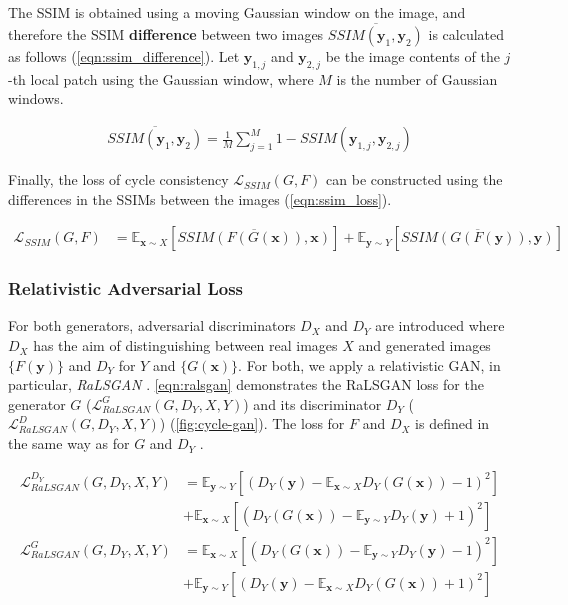 \documentclass[a4paper,11pt, DIV=12]{scrartcl}
\newcommand{\x}{\boldsymbol{x}}
\newcommand{\y}{\boldsymbol{y}}
\begin{document}
The SSIM is obtained using a moving Gaussian window on the image, and therefore the SSIM \textbf{difference} between two images $\overline{SSIM(\y_1,\y_2)}$ is calculated as follows (\autoref{eqn:ssim_difference}).
Let $\y_{1,j}$ and $\y_{2,j}$ be the image contents of the $j$-th local patch using the Gaussian window, where $M$ is the number of Gaussian windows.

\begin{equation}
   \label{eqn:ssim_difference}
   \begin{aligned}
      \overline{SSIM(\y_1,\y_2)} = \frac{1}{M}\sum_{j=1}^{M}1 - SSIM(\y_{1,j},\y_{2,j})
   \end{aligned}
\end{equation}

Finally, the loss of cycle consistency $\mathcal{L}_{SSIM}(G, F)$ can be constructed using the differences in the SSIMs between the images (\autoref{eqn:ssim_loss}).

\begin{equation}
   \label{eqn:ssim_loss}
   \begin{aligned}
      \mathcal{L}_{SSIM}(G,F) & = \mathbb{E}_{\x \sim X}\left[\overline{SSIM(F(G(\x)), \x)}\right] + \mathbb{E}_{\y \sim Y}\left[\overline{SSIM(G(F(\y)), \y)}\right]
   \end{aligned}
\end{equation}


\subsubsection*{Relativistic Adversarial Loss}
For both generators, adversarial discriminators $D_X$ and $D_Y$ are introduced where $D_X$ has the aim of distinguishing between real images
$X$ and generated images $\{F(\y)\}$ and $D_Y$ for $Y$ and $\{G(\x)\}$.
For both, we apply a relativistic GAN, in particular, \textit{RaLSGAN} \cite{mehri2019colorizing,rel_gan}.
\autoref{eqn:ralsgan} demonstrates the RaLSGAN loss for the generator $G$ ($\mathcal{L}^G_{RaLSGAN}(G,D_Y,X,Y)$) and its discriminator
$D_Y$ ($\mathcal{L}^D_{RaLSGAN}(G,D_Y,X,Y)$) (\autoref{fig:cycle-gan}). The loss for $F$ and $D_X$ is defined in the same way as for $G$ and $D_Y$ \cite{rel_gan}.

\begin{equation}
   \label{eqn:ralsgan}
   \begin{aligned}
      \mathcal{L}^{D_Y}_{RaLSGAN}(G,D_Y,X,Y) & = \mathbb{E}_{\y \sim Y}\left[(D_Y(\y) - \mathbb{E}_{\x \sim X} D_Y(G(\x)) - 1)^2 \right] \\
                                             & + \mathbb{E}_{\x \sim X}\left[(D_Y(G(\x)) - \mathbb{E}_{\y \sim Y} D_Y(\y) + 1)^2 \right] \\
      \mathcal{L}^G_{RaLSGAN}(G,D_Y,X,Y)     & = \mathbb{E}_{\x \sim X}\left[(D_Y(G(\x)) - \mathbb{E}_{\y \sim Y} D_Y(\y) - 1)^2 \right] \\
                                             & + \mathbb{E}_{\y \sim Y}\left[(D_Y(\y) - \mathbb{E}_{\x \sim X} D_Y(G(\x)) + 1)^2 \right]
   \end{aligned}
\end{equation}
\end{document}
